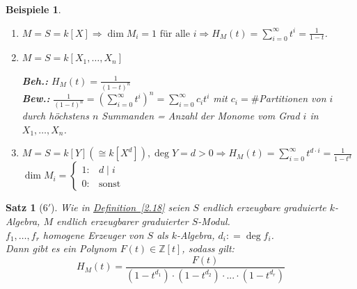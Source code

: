 \documentclass[a4paper,12pt]{scrbook}
\theoremstyle{break}
\theoremstyle{nonumberbreak}
\newtheorem{nnBsp}{Beispiele}
\newtheorem{nnSatz}{Satz}
\theoremstyle{nonumberplain}
\newcommand{\defeqr}[0]{\mathrel{\mathop:}=}
\newcommand{\myref}[2]{%
\hyperref[#2]{#1~\ref*{#2}}%
}
\begin{document}
\begin{nnBsp}
  \begin{enumerate}
    \item[1.)] $M = S = k[X] \Rightarrow \dim M_i = 1 \text{ für alle }i
               \Rightarrow H_M(t) = \sum_{i=0}^{\infty}t^i = \frac{1}{1-t}$.
    \item[2.)] $M = S = k[X_1, \dots, X_n]$

               \textbf{Beh.:} $H_M(t) = \frac{1}{(1-t)^n}$\\
               \textbf{Bew.:} $\frac{1}{(1-t)^n} = \left( \sum_{i=0}^{\infty}
               t^i\right)^n = \sum_{i=0}^{\infty} c_i t^i$ mit $c_i =
               \#$Partitionen von $i$ durch höchstens $n$ Summanden = Anzahl der
               Monome vom Grad $i$ in $X_1, \dots, X_n$.
    \item[3.)] $M = S = k[Y] (\cong k[X^d]), \deg Y = d > 0 \Rightarrow
               H_M(t) = \sum_{i = 0}^{\infty} t^{d \cdot i} = \frac{1}{1-t^d}$\\
               $\dim M_i = \begin{cases}1: & d \mid i\\ 0: & \text{sonst} \end{cases}$
  \end{enumerate}
\end{nnBsp}

\begin{nnSatz}[$6'$]
  Wie in \myref{Definition}{2.18} seien $S$ endlich erzeugbare graduierte $k$-Algebra, $M$ endlich erzeugbarer graduierter $S$-Modul.\\
  $f_1, \dots, f_r$ homogene Erzeuger von $S$ als $k$-Algebra, $d_i \defeqr \deg f_i$.\\
  Dann gibt es ein Polynom $F(t) \in \mathbb{Z}[t]$, sodass gilt:
  $$H_M(t) = \frac{F(t)}{(1-t^{d_1}) \cdot (1-t^{d_2}) \cdot ... \cdot 
  (1-t^{d_r})}$$
\end{nnSatz}
\end{document}
